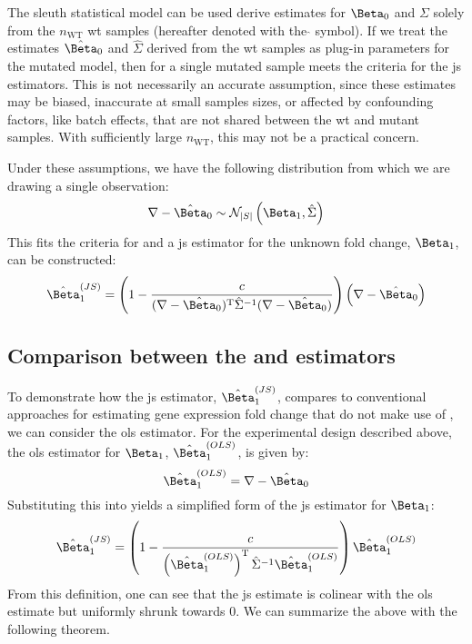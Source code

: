 The sleuth statistical model can be used derive estimates for $\Beta_0$ and $\Sigma$ solely from the $n_\mathrm{WT}$ \gls{wt} samples (hereafter denoted with the $\hat{}$ symbol).
If we treat the estimates $\hat{\Beta}_0$ and $\hat{\Sigma}$ derived from the \gls{wt} samples as plug-in parameters for the mutated model, then  for a single mutated sample meets the criteria for the \gls{js} estimators.
This is not necessarily an accurate assumption, since these estimates may be biased, inaccurate at small samples sizes, or affected by confounding factors, like batch effects, that are not shared between the \gls{wt} and mutant samples.
With sufficiently large $n_\mathrm{WT}$, this may not be a practical concern.

Under these assumptions, we have the following distribution from which we are drawing a single observation:
%
\begin{equation}
  \nabla - \hat{\Beta}_0 \sim \mathcal{N}_{|S|} \left( \Beta_1, \hat{\Sigma} \right)
\end{equation}
%
This fits the criteria for  and a \gls{js} estimator for the unknown fold change, $\Beta_1$, can be constructed:
%
\begin{equation}
  \fcjs = \left( 1 - \frac{c}{(\nabla - \hat{\Beta}_0)^\tran \hat{\Sigma}^{-1} (\nabla - \hat{\Beta}_0)} \right) \left(\nabla - \hat{\Beta}_0 \right)
  \label{eqn:js_defn}
\end{equation}

\subsection{Comparison between the  and  estimators}

To demonstrate how the \gls{js} estimator, $\fcjs$, compares to conventional approaches for estimating gene expression fold change that do not make use of , we can consider the \gls{ols} estimator.
For the experimental design described above, the \gls{ols} estimator for $\Beta_1$, $\fcols$, is given by:
%
\begin{equation}
  \fcols = \nabla - \hat{\Beta}_0
  \label{eqn:ols_defn}
\end{equation}
%
Substituting this into  yields a simplified form of the \gls{js} estimator for $\Beta_1$:
%
\begin{equation}
  \fcjs = \left( 1 - \frac{c}{\left( \fcols \right)^\tran \hat{\Sigma}^{-1} \fcols} \right) \fcols
  \label{eqn:js_defn_ols}
\end{equation}
%
From this definition, one can see that the \gls{js} estimate is colinear with the \gls{ols} estimate but uniformly shrunk towards 0.
We can summarize the above with the following theorem.

